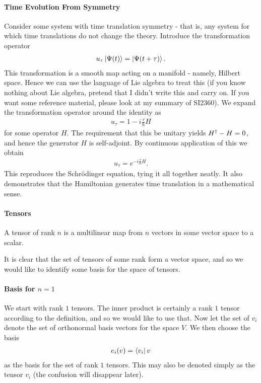 \paragraph{Time Evolution From Symmetry}
Consider some system with time translation symmetry - that is, any system for which time translations do not change the theory. Introduce the transformation operator
\begin{align*}
	u_{\tau}\ket{\Psi(t)} = \ket{\Psi(t + \tau)}.
\end{align*}
This transformation is a smooth map acting on a manifold - namely, Hilbert space. Hence we can use the language of Lie algebra to treat this (if you know nothing about Lie algebra, pretend that I didn't write this and carry on. If you want some reference material, please look at my summary of SI2360). We expand the transformation operator around the identity as
\begin{align*}
	u_{\tau} = 1 - i\frac{\tau}{\hbar}H
\end{align*}
for some operator $H$. The requirement that this be unitary yields $H^{\dagger} - H = 0$, and hence the generator $H$ is self-adjoint. By continuous application of this we obtain
\begin{align*}
u_{\tau} = e^{-i\frac{\tau}{\hbar}H}.
\end{align*}
This reproduces the Schrödinger equation, tying it all together neatly. It also demonstrates that the Hamiltonian generates time translation in a mathematical sense.

\paragraph{Tensors}
A tensor of rank $n$ is a multilinear map from $n$ vectors in some vector space to a scalar.

It is clear that the set of tensors of some rank form a vector space, and so we would like to identify some basis for the space of tensors.

\paragraph{Basis for $n = 1$}
We start with rank $1$ tensors. The inner product is certainly a rank $1$ tensor according to the definition, and so we would like to use that. Now let the set of $v_{i}$ denote the set of orthonormal basis vectors for the space $V$. We then choose the basis
\begin{align*}
	e_{i}(v) = \bra{v_{i}}{v}
\end{align*}
as the basis for the set of rank $1$ tensors. This may also be denoted simply as the tensor $v_{i}$ (the confusion will disappear later).

